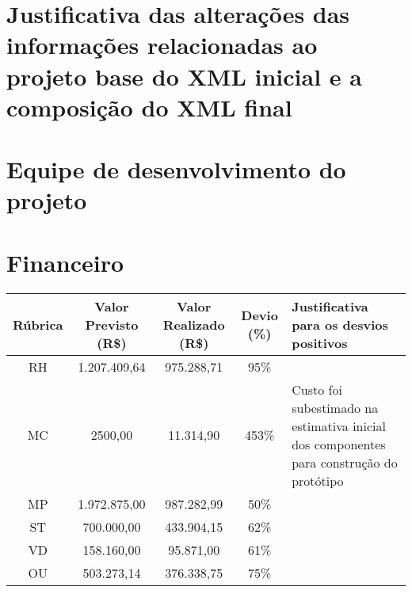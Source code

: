 
\section{Justificativa das alterações das informações relacionadas ao projeto
base do XML inicial e a composição do XML final}

 
\section{Equipe de desenvolvimento do projeto}

\section{Financeiro}
\begin{center}
  \begin{tabular}{ | c | c | c | c | p{4.9cm} | }
    \hline
        \textbf{Rúbrica} & \textbf{Valor Previsto (R\$)} & \textbf{Valor Realizado (R\$)} & \textbf{Devio (\%)} & \textbf{Justificativa para os desvios positivos} \\ \hline
    RH & 1.207.409,64 & 975.288,71 & 95\%  &  \\ \hline
    MC & 2500,00      & 11.314,90  & 453\% &  Custo foi subestimado na estimativa  inicial dos componentes para construção do protótipo \\ \hline
    MP & 1.972.875,00 & 987.282,99 & 50\%  &  \\ \hline
    ST & 700.000,00   & 433.904,15 & 62\%  &  \\ \hline
    VD & 158.160,00   & 95.871,00  & 61\%  &  \\ \hline
    OU & 503.273,14   & 376.338,75 & 75\%  &  \\
    \hline
  \end{tabular}
\end{center}

\standardchapterstyle



\fancychapterstyle